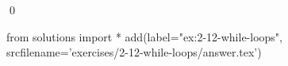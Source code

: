 
\begin{ex}
  \label{ex:2-12-while-loops}
  
  \qed
\end{ex}
\begin{python0}
from solutions import *
add(label="ex:2-12-while-loops",
    srcfilename='exercises/2-12-while-loops/answer.tex')
\end{python0}
